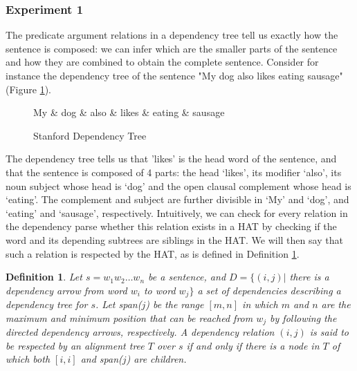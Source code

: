 \documentclass[a4paper, 11pt]{report}
\theoremstyle{definition}
\theoremstyle{plain}
\newtheorem{definition}{Definition}
\begin{document}
\subsubsection{Experiment 1}


The predicate argument relations in a dependency tree tell us exactly how the sentence is composed: we can infer which are the smaller parts of the sentence and how they are combined to obtain the complete sentence. Consider for instance the dependency tree of the sentence "My dog also likes eating sausage" (Figure \ref{fig:deptree1}).

\begin{figure}[!h]\label{fig:deptree1}
\centering
\begin{dependency}[theme=simple]%
\begin{deptext}[column sep=.5cm, row sep=.1ex]
My \& dog \& also \& likes \& eating \& sausage \\
\end{deptext}
\end{dependency}
\caption{Stanford Dependency Tree}
\end{figure}

The dependency tree tells us that 'likes' is the head word of the sentence, and that the sentence is composed of 4 parts: the head `likes', its modifier `also', its noun subject whose head is `dog' and the open clausal complement whose head is `eating'. The complement and subject are further divisible in `My' and `dog', and `eating' and `sausage', respectively. Intuitively, we can check for every relation in the dependency parse whether this relation exists in a HAT by checking if the word and its depending subtrees are siblings in the HAT. We will then say that such a relation is respected by the HAT, as is defined in Definition \ref{def:depHAT}.



\begin{definition}\label{def:depHAT}
Let $s = w_1 w_2 \dots w_n$ be a sentence, and $D = \{ (i,j) |$ there is a dependency arrow from word $w_i$ to word $w_j \}$ a set of dependencies describing a dependency tree for $s$. Let span($j$) be the range $[m,n]$ in which $m$ and $n$ are the maximum and minimum position that can be reached from $w_j$ by following the directed dependency arrows, respectively. A dependency relation $(i,j)$ is said to be respected by an alignment tree $T$ over $s$ if and only if there is a node in $T$ of which both $[i,i]$ and span($j$) are children.
\end{definition}
\end{document}
